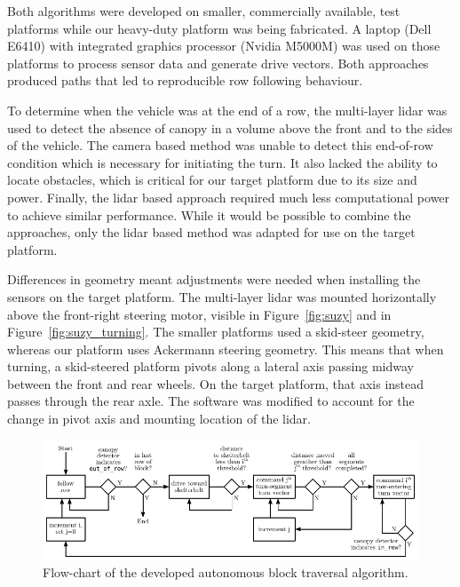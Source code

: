 \documentclass[preprint,authoryear,12pt]{elsarticle}
\begin{document}
    Both algorithms were developed on smaller, commercially available, test platforms while our heavy-duty  platform was being fabricated.
    A laptop (Dell E6410) with integrated graphics processor (Nvidia M5000M) was used on those platforms to process sensor data and generate drive vectors.
    Both approaches produced paths that led to reproducible row following behaviour.

    To determine when the vehicle was at the end of a row, the multi-layer lidar was used to detect the absence of canopy in a volume above the front and to the sides of the vehicle.
    The camera based method was unable to detect this end-of-row condition which is necessary for initiating the turn.
    It also lacked the ability to locate obstacles, which is critical for our target platform due to its size and power.
    Finally, the lidar based approach required much less computational power to achieve similar performance.
    While it would be possible to combine the approaches, only the lidar based method was adapted for use on the target platform.

    Differences in geometry meant adjustments were needed when installing the sensors on the target platform.
    The multi-layer lidar was mounted horizontally above the front-right steering motor, visible in Figure~\ref{fig:suzy} and in Figure~\ref{fig:suzy_turning}.
    The smaller platforms used a skid-steer geometry, whereas our platform uses Ackermann steering geometry.
    This means that when turning, a skid-steered platform pivots along a lateral axis passing midway between the front and rear wheels.
    On the target platform, that axis instead passes through the rear axle.
    The software was modified to account for the change in pivot axis and mounting location of the lidar.

    \begin{figure}[htb]
        \centering
        \includegraphics[width=\linewidth]{imgs/turning_diagrams/flowchart.pdf}
        \caption{
            Flow-chart of the developed autonomous block traversal algorithm.
        }
        \label{fig:turn_diagram}
    \end{figure}
\end{document}
